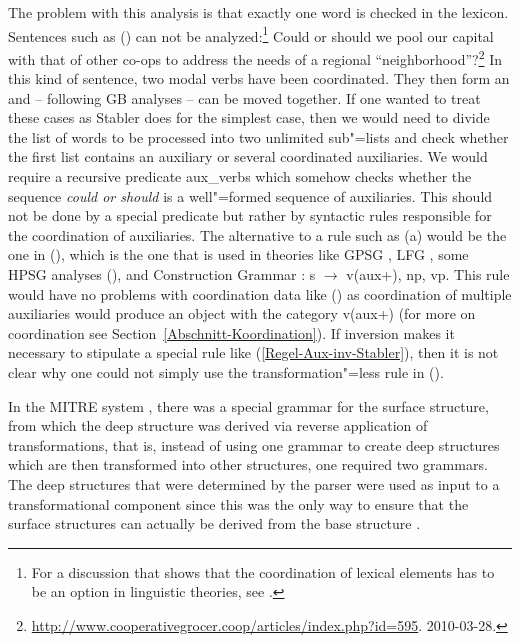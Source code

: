 The problem with this analysis is that exactly one word is checked in the lexicon. Sentences such as () can not be analyzed:\footnote{%
  For a discussion that shows that the coordination of lexical elements has to be an option in linguistic theories, see .
} 
\ea
Could or should we pool our capital with that of other co-ops to address the needs of a regional
``neighborhood''?\footnote{%
  \url{http://www.cooperativegrocer.coop/articles/index.php?id=595}. 2010-03-28.
}
\z
In this kind of sentence, two modal verbs have been coordinated. They then form an \xzero and -- following GB analyses -- can be
moved together. If one wanted to treat these cases as Stabler does for the simplest case, then we would need to divide the list of words to be
processed into two unlimited sub"=lists and check whether the first list contains an auxiliary or several coordinated auxiliaries. We would
require a recursive predicate aux\_verbs which somehow checks whether the sequence \emph{could or should} is a well"=formed sequence of 
auxiliaries. This should not be done by a special predicate but rather by syntactic rules responsible for the coordination of auxiliaries.
The alternative to a rule such as (a) would be the one in (), which is the one that
is used in theories like GPSG \citep[]{GKPS85a}, LFG \citep[]{Falk84a-u}, some HPSG analyses
(\citealp[]{GSag2000a-u}), and Construction Grammar
\citep{Fillmore99a}:%
\ea
s $\to$ v(aux+), np, vp.
\z
This rule would have no problems with coordination data like () as coordination of multiple auxiliaries would produce an object with the
category v(aux+) (for more on coordination see Section~\ref{Abschnitt-Koordination}). If inversion
makes it necessary to stipulate a special rule like (\ref{Regel-Aux-inv-Stabler}), then it is not clear why one could not simply use the transformation"=less rule in ().

In the MITRE system \citep{ZFHW65a}, there was a special grammar for the surface structure, from which the deep structure was derived via
reverse application of transformations, that is, instead of using one grammar to create deep structures which are then transformed into
other structures, one required two grammars. The deep structures that were determined by the parser
were used as input to a transformational component since this was the only way to ensure that
the surface structures can actually be derived from the base structure \citep[]{Kay2011a}.

